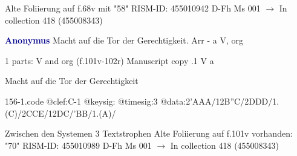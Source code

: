 \documentclass[twocolumn]{book}
\begin{document}
\newline Alte Foliierung auf f.68v mit "58"
\newline RISM-ID: 455010942
\newline D-Fh  Ms 001
\newline $\rightarrow$ In collection 418 (455008343)
      
\newline \par \vspace{7pt} \textcolor{darkblue}{\textbf{Anonymus  }}
\newline Macht auf die Tor der Gerechtigkeit. Arr - a
\newline V, org
\newline \begin{itshape}\end{itshape} 
\newline \textcolor{darkblue}{}  1 parts: V and org  (f.101v-102r)
\newline Manuscript copy
.1  V  a
\newline \begin{footnotesize} Macht auf die Tor der Gerechtigkeit \end{footnotesize}  
\begin{filecontents*}{156-1.code}
@clef:C-1
@keysig:
@timesig:3
@data:2'AAA/12B''C/2DDD/1.(C)/2CCE/12DC/'BB/1.(A)/
\end{filecontents*}
\newline
%

\newline Zwischen den Systemen 3 Textstrophen
\newline Alte Foliierung auf f.101v vorhanden: "70"
\newline RISM-ID: 455010989
\newline D-Fh  Ms 001
\newline $\rightarrow$ In collection 418 (455008343)
      
\end{document}
